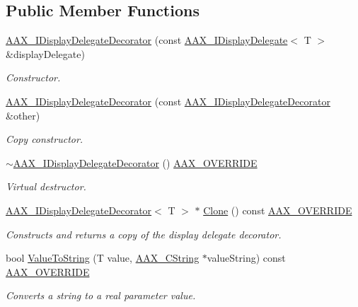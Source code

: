 \subsection*{Public Member Functions}
\begin{DoxyCompactItemize}
\item 
\mbox{\hyperlink{a01805_a1e103af1eaeb6530317db4e41843c166}{A\+A\+X\+\_\+\+I\+Display\+Delegate\+Decorator}} (const \mbox{\hyperlink{a01801}{A\+A\+X\+\_\+\+I\+Display\+Delegate}}$<$ T $>$ \&display\+Delegate)
\begin{DoxyCompactList}\small\item\em Constructor. \end{DoxyCompactList}\item 
\mbox{\hyperlink{a01805_a5e3239fa6b4289dd7b3f99ce8ac1243d}{A\+A\+X\+\_\+\+I\+Display\+Delegate\+Decorator}} (const \mbox{\hyperlink{a01805}{A\+A\+X\+\_\+\+I\+Display\+Delegate\+Decorator}} \&other)
\begin{DoxyCompactList}\small\item\em Copy constructor. \end{DoxyCompactList}\item 
\mbox{\hyperlink{a01805_a65993ca0ac3d206e9526985190e2add9}{$\sim$\+A\+A\+X\+\_\+\+I\+Display\+Delegate\+Decorator}} () \mbox{\hyperlink{a00392_ac2f24a5172689ae684344abdcce55463}{A\+A\+X\+\_\+\+O\+V\+E\+R\+R\+I\+DE}}
\begin{DoxyCompactList}\small\item\em Virtual destructor. \end{DoxyCompactList}\item 
\mbox{\hyperlink{a01805}{A\+A\+X\+\_\+\+I\+Display\+Delegate\+Decorator}}$<$ T $>$ $\ast$ \mbox{\hyperlink{a01805_a8e2ad7312467089a9112ba6460fe0e5b}{Clone}} () const \mbox{\hyperlink{a00392_ac2f24a5172689ae684344abdcce55463}{A\+A\+X\+\_\+\+O\+V\+E\+R\+R\+I\+DE}}
\begin{DoxyCompactList}\small\item\em Constructs and returns a copy of the display delegate decorator. \end{DoxyCompactList}\item 
bool \mbox{\hyperlink{a01805_ada5780cfa332ac7946bf95aa65ae96f5}{Value\+To\+String}} (T value, \mbox{\hyperlink{a01573}{A\+A\+X\+\_\+\+C\+String}} $\ast$value\+String) const \mbox{\hyperlink{a00392_ac2f24a5172689ae684344abdcce55463}{A\+A\+X\+\_\+\+O\+V\+E\+R\+R\+I\+DE}}
\begin{DoxyCompactList}\small\item\em Converts a string to a real parameter value. \end{DoxyCompactList}\item 

\end{DoxyCompactItemize}
